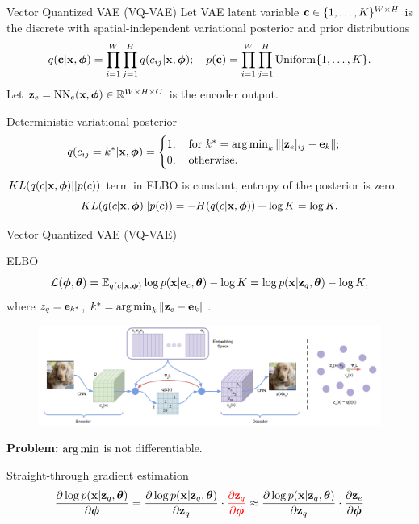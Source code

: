 \begin{frame}{Vector Quantized VAE (VQ-VAE)}
	Let VAE latent variable $\mathbf{c} \in \{1, \dots, K\}^{W \times H}$ is the discrete with spatial-independent variational posterior and prior distributions  
	\vspace{-0.3cm}
	\[
	q(\mathbf{c} | \mathbf{x}, \boldsymbol{\phi}) = \prod_{i=1}^W \prod_{j=1}^H q(c_{ij} | \mathbf{x}, \boldsymbol{\phi}); \quad p(\mathbf{c}) = \prod_{i=1}^W \prod_{j=1}^H \text{Uniform}\{1, \dots, K\}.
	\]
	Let $\mathbf{z}_e = \text{NN}_e(\mathbf{x}, \boldsymbol{\phi}) \in \mathbb{R}^{W \times H \times C}$ is the encoder output.
	\begin{block}{Deterministic variational posterior}
		\vspace{-0.6cm}
		\[
		q(c_{ij} = k^* | \mathbf{x}, \boldsymbol{\phi}) = \begin{cases}
			1 , \quad \text{for } k^* = \operatorname*{arg\,min}_k \| [\mathbf{z}_e]_{ij} - \mathbf{e}_k \|; \\
			0, \quad \text{otherwise}.
		\end{cases}
		\]
		$KL(q(c| \mathbf{x}, \boldsymbol{\phi}) || p(c))$ term in ELBO is constant, entropy of the posterior is zero.
		\[
		KL(q(c | \mathbf{x}, \boldsymbol{\phi}) || p(c)) = - H(q(c | \mathbf{x}, \boldsymbol{\phi})) + \log K = \log K. 
		\]
	\end{block}
	
\end{frame}
\begin{frame}{Vector Quantized VAE (VQ-VAE)}
	\begin{block}{ELBO}
		\vspace{-0.6cm}
		\[
		\mathcal{L} (\boldsymbol{\phi}, \boldsymbol{\theta})  = \mathbb{E}_{q(c | \mathbf{x}, \boldsymbol{\phi})} \log p(\mathbf{x} | \mathbf{e}_{c} , \boldsymbol{\theta}) - \log K =  \log p(\mathbf{x} | \mathbf{z}_q, \boldsymbol{\theta}) - \log K,
		\]
		where $z_q = \mathbf{e}_{k^*}$, $k^* = \operatorname*{arg\,min}_k \| \mathbf{z}_e - \mathbf{e}_k \|$.
	\end{block}
	\begin{figure}
		\centering
		\includegraphics[width=0.85\linewidth]{figs/vqvae}
	\end{figure}
	\textbf{Problem:} $\operatorname*{arg\,min}$ is not differentiable.
	\begin{block}{Straight-through gradient estimation}
		\vspace{-0.6cm}
		\[
		\frac{\partial \log p(\mathbf{x} | \mathbf{z}_q , \boldsymbol{\theta})}{\partial \boldsymbol{\phi}} = \frac{\partial \log p(\mathbf{x} | \mathbf{z}_q, \boldsymbol{\theta})}{\partial \mathbf{z}_q} \cdot {\color{red}\frac{\partial \mathbf{z}_q}{\partial \boldsymbol{\phi}}} \approx \frac{\partial \log p(\mathbf{x} | \mathbf{z}_q, \boldsymbol{\theta})}{\partial \mathbf{z}_q} \cdot \frac{\partial \mathbf{z}_e}{\partial \boldsymbol{\phi}}
		\]
	\end{block}
\end{frame}
